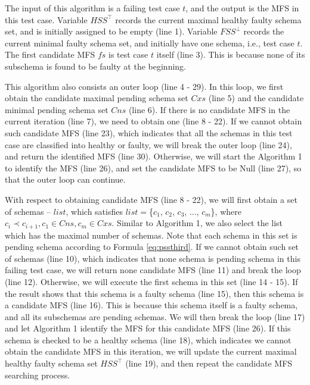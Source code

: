 \documentclass{sig-alternate-05-2015}
\begin{document}
{{The input of this algorithm is a failing test case $t$, and the output is the MFS in this test case. Variable $HSS^{\top}$ records the current maximal healthy faulty schema set, and is initially assigned to be empty (line 1).   Variable $FSS^{\bot}$ records the current minimal faulty schema set, and initially have one schema, i.e., test case $t$. The first candidate MFS $fs$ is test case $t$ itself (line 3). This is because none of its subschema is found to be faulty at the beginning.

This algorithm also consists an outer loop (line 4 - 29). In this loop, we first obtain the candidate maximal pending schema set $Cxs$ (line 5) and the candidate minimal pending schema set $Cns$ (line 6). If there is no candidate MFS in the current iteration (line 7), we need to obtain one (line 8 - 22).  If we cannot obtain such candidate MFS (line 23), which indicates that all the schemas in this test case are classified into healthy or faulty, we will break the outer loop (line 24), and return the identified MFS (line 30). Otherwise, we will start the Algorithm 1 to identify the MFS (line 26), and set the candidate MFS to be Null (line 27), so that the outer loop can continue.

With respect to obtaining candidate MFS (line 8 - 22), we will first obtain a set of schemas -- $list$, which satisfies $list = $\{$c_{1}$, $c_{2}$, $c_{3}$, ..., $c_{m}$\}, where $c_{i} \prec c_{i+1}, c_{1} \in Cns, c_{m} \in Cxs$. Similar to Algorithm 1, we also select the list which has the maximal number of schemas. Note that each schema in this set is pending schema according to Formula \ref{eq:pssthird}. If we cannot obtain such set of schemas (line 10), which indicates that none schema is pending schema in this failing test case, we will return none candidate MFS (line 11) and break the loop (line 12). Otherwise, we will execute the first schema in this set (line 14 - 15). If the result shows that this schema is a faulty schema (line 15), then this schema is a candidate MFS (line 16). This is because this schema itself is a faulty schema, and all its subschemas are pending schemas. We will then break the loop (line 17) and let Algorithm 1 identify the MFS for this candidate MFS (line 26). If this schema is checked to be a healthy schema (line 18), which indicates we cannot obtain the candidate MFS in this iteration, we will update the current maximal healthy faulty schema set $HSS^{\top}$ (line 19), and then repeat the candidate MFS searching process.



}}
\end{document}
